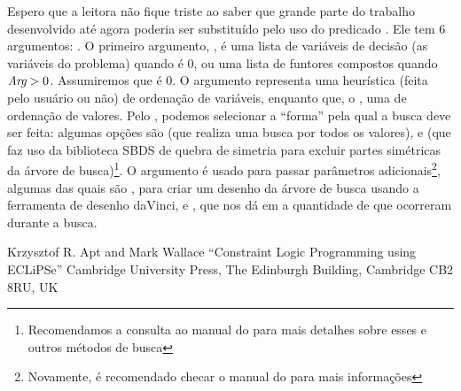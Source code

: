 \documentclass{article}
\begin{document}
Espero que a leitora não fique triste ao saber que grande parte do trabalho desenvolvido até agora
poderia ser substituído pelo uso do predicado . Ele tem 6 argumentos:
. O primeiro argumento,
, é uma lista de variáveis de decisão (as variáveis do problema) quando  é 0, ou
uma lista de funtores compostos quando $\textit{Arg} > 0$. Assumiremos que  é 0. O argumento 
representa uma heurística (feita pelo usuário ou não) de ordenação de variáveis, enquanto que, o
, uma de ordenação de valores. Pelo , podemos selecionar a ``forma'' pela
qual a busca deve ser feita: algumas opções são  (que realiza uma busca por
todos os valores), e  (que faz uso da biblioteca SBDS de quebra de simetria para
excluir partes simétricas da árvore de busca)\footnote{Recomendamos a consulta ao manual do \eclipse
para mais detalhes sobre esses e outros métodos de busca}. O argumento  é usado para
passar parâmetros adicionais\footnote{Novamente, é recomendado checar o manual do \eclipse para mais
informações}, algumas das quais são , para criar um desenho da
árvore de busca usando a ferramenta de desenho daVinci, e , que nos dá em
 a quantidade de  que ocorreram durante a busca.




  \begin{thebibliography}{2}

    Krzysztof R. Apt and Mark Wallace
    ``Constraint Logic Programming using ECLiPSe''
    Cambridge University Press,
    The Edinburgh Building, Cambridge CB2 8RU, UK


  \end{thebibliography}
\end{document}
